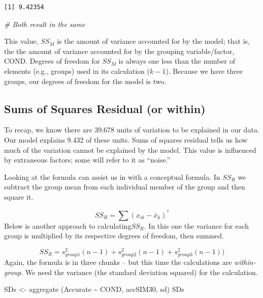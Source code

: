 \documentclass[
  11pt,
]{book}
\newenvironment{Shaded}{\begin{snugshade}}{\end{snugshade}}
\newcommand{\CommentTok}[1]{\textcolor[rgb]{0.56,0.35,0.01}{\textit{#1}}}
\newcommand{\FunctionTok}[1]{\textcolor[rgb]{0.00,0.00,0.00}{#1}}
\newcommand{\NormalTok}[1]{#1}
\newcommand{\OtherTok}[1]{\textcolor[rgb]{0.56,0.35,0.01}{#1}}
\newcommand{\SpecialCharTok}[1]{\textcolor[rgb]{0.00,0.00,0.00}{#1}}
\begin{document}
\begin{verbatim}
[1] 9.42354
\end{verbatim}

\begin{Shaded}
\begin{Highlighting}[]
\CommentTok{\# Both result in the same}
\end{Highlighting}
\end{Shaded}

This value, \(SS_M\) is the amount of variance accounted for by the model; that is, the the amount of variance accounted for by the grouping variable/factor, COND. Degrees of freedom for \(SS_M\) is always one less than the number of elements (e.g., groups) used in its calculation (\(k-1\)). Because we have three groups, our degrees of freedom for the model is two.

\hypertarget{sums-of-squares-residual-or-within}{%
\subsection{Sums of Squares Residual (or within)}\label{sums-of-squares-residual-or-within}}

To recap, we know there are 39.678 units of variation to be explained in our data. Our model explains 9.432 of these units. Sums of squares residual tells us how much of the variation cannot be explained by the model. This value is influenced by extraneous factors; some will refer to it as ``noise.''

Looking at the formula can assist us in with a conceptual formula. In \(SS_R\) we subtract the group mean from each individual member of the group and then square it.

\[SS_{R}= \sum(x_{ik}-\bar{x}_{k})^{^{2}}\]
Below is another approach to calculating\(SS_R\). In this one the variance for each group is multiplied by its respective degrees of freedom, then summed.

\[SS_{R}= s_{group1}^{2}(n-1) + s_{group2}^{2}(n-1) + s_{group3}^{2}(n-1))\]
Again, the formula is in three chunks -- but this time the calculations are \emph{within-group}. We need the variance (the standard deviation squared) for the calculation.

\begin{Shaded}
\begin{Highlighting}[]
\NormalTok{SDs }\OtherTok{\textless{}{-}} \FunctionTok{aggregate}\NormalTok{ (Accurate }\SpecialCharTok{\textasciitilde{}}\NormalTok{ COND, accSIM30, sd)}
\NormalTok{SDs}
\end{Highlighting}
\end{Shaded}
\end{document}
